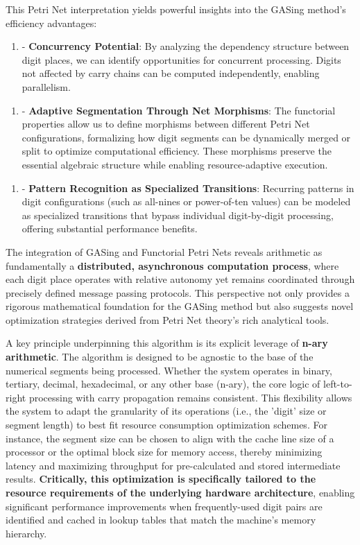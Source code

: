 \documentclass[11pt,a4paper]{article}
\begin{document}
This Petri Net interpretation yields powerful insights into the GASing method's efficiency advantages:

\begin{enumerate}
  \item - \textbf{Concurrency Potential}: By analyzing the dependency structure between digit places, we can identify opportunities for concurrent processing. Digits not affected by carry chains can be computed independently, enabling parallelism.
\end{enumerate}

\begin{enumerate}
  \item - \textbf{Adaptive Segmentation Through Net Morphisms}: The functorial properties allow us to define morphisms between different Petri Net configurations, formalizing how digit segments can be dynamically merged or split to optimize computational efficiency. These morphisms preserve the essential algebraic structure while enabling resource-adaptive execution.
\end{enumerate}

\begin{enumerate}
  \item - \textbf{Pattern Recognition as Specialized Transitions}: Recurring patterns in digit configurations (such as all-nines or power-of-ten values) can be modeled as specialized transitions that bypass individual digit-by-digit processing, offering substantial performance benefits.
\end{enumerate}

The integration of GASing and Functorial Petri Nets reveals arithmetic as fundamentally a \textbf{distributed, asynchronous computation process}, where each digit place operates with relative autonomy yet remains coordinated through precisely defined message passing protocols. This perspective not only provides a rigorous mathematical foundation for the GASing method but also suggests novel optimization strategies derived from Petri Net theory's rich analytical tools.

A key principle underpinning this algorithm is its explicit leverage of \textbf{n-ary arithmetic}. The algorithm is designed to be agnostic to the base of the numerical segments being processed. Whether the system operates in binary, tertiary, decimal, hexadecimal, or any other base (n-ary), the core logic of left-to-right processing with carry propagation remains consistent. This flexibility allows the system to adapt the granularity of its operations (i.e., the 'digit' size or segment length) to best fit resource consumption optimization schemes. For instance, the segment size can be chosen to align with the cache line size of a processor or the optimal block size for memory access, thereby minimizing latency and maximizing throughput for pre-calculated and stored intermediate results. \textbf{Critically, this optimization is specifically tailored to the resource requirements of the underlying hardware architecture}, enabling significant performance improvements when frequently-used digit pairs are identified and cached in lookup tables that match the machine's memory hierarchy.
\end{document}
